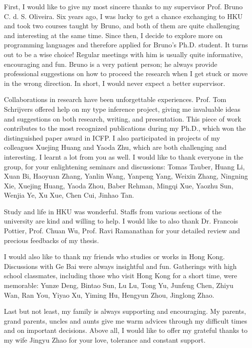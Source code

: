 
First, I would like to give my most sincere thanks to my supervisor Prof. Bruno C. d. S. Oliveira.
Six years ago, I was lucky to get a chance exchanging to HKU and
took two courses taught by Bruno,
and both of them are quite challenging and interesting at the same time.
Since then, I decide to explore more on programming languages and
therefore applied for Bruno's Ph.D. student.
It turns out to be a wise choice!
Regular meetings with him is usually quite informative, encouraging and fun.
Bruno is a very patient person;
he always provide professional suggestions on how to proceed the research when I get stuck or
move in the wrong direction.
In short, I would never expect a better supervisor.

Collaborations in research have been unforgettable experiences.
Prof. Tom Schrijvers offered help on my type inference project,
giving me invaluable ideas and suggestions on both research, writing, and presentation.
This piece of work contributes to the most recognized publications during my Ph.D.,
which won the distinguished paper award in ICFP.
I also participated in projects of my colleagues Xuejing Huang and Yaoda Zhu,
which are both challenging and interesting. I learnt a lot from you as well.
I would like to thank everyone in the group, for your enlightening seminars and discussions:
%
Tomas Tauber, Huang Li, Xuan Bi, Haoyuan Zhang, Yanlin Wang, Yanpeng Yang,
Weixin Zhang, Ningning Xie, 
%
Xuejing Huang, Yaoda Zhou, Baber Rehman, Mingqi Xue, Yaozhu Sun, Wenjia Ye, Xu Xue,
Chen Cui, Jinhao Tan.


Study and life in HKU was wonderful. Staffs from various sections of the university
are kind and willing to help.
I would like to also thank Dr. Francois Pottier, Prof. Chuan Wu, Prof. Ravi Ramanathan
for your detailed review and precious feedbacks of my thesis.


I would also like to thank my friends who studies or works in Hong Kong.
Discussions with Ge Bai were always insightful and fun.
Gatherings with high school classmates, including those who visit Hong Kong for a short time,
were memorable:
Yunze Deng, Bintao Sun, Lu Lu, Tong Yu, Junfeng Chen, Zhiyu Wan, Ran You,
Yiyao Xu, Yiming Hu, Hengyun Zhou, Jinglong Zhao.


Last but not least, my family is always supporting and encouraging.
My parents, grand parents, uncles and aunts give me warm advices through
my difficult times and on important decisions.
Above all, I would like to offer my grateful thanks to my wife Jingyu Zhao
for your love, tolerance and constant support.


